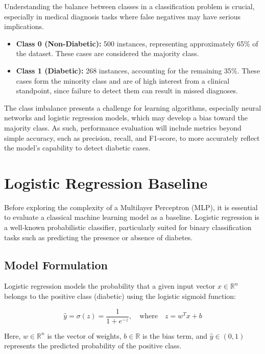 \documentclass[12pt]{article}
\begin{document}
Understanding the balance between classes in a classification problem is crucial, especially in medical diagnosis tasks where false negatives may have serious implications.

\begin{itemize}
    \item \textbf{Class 0 (Non-Diabetic):} 500 instances, representing approximately 65\% of the dataset. These cases are considered the majority class.
    
    \item \textbf{Class 1 (Diabetic):} 268 instances, accounting for the remaining 35\%. These cases form the minority class and are of high interest from a clinical standpoint, since failure to detect them can result in missed diagnoses.

\end{itemize}

The class imbalance presents a challenge for learning algorithms, especially neural networks and logistic regression models, which may develop a bias toward the majority class. As such, performance evaluation will include metrics beyond simple accuracy, such as precision, recall, and F1-score, to more accurately reflect the model’s capability to detect diabetic cases.

\section{Logistic Regression Baseline}

Before exploring the complexity of a Multilayer Perceptron (MLP), it is essential to evaluate a classical machine learning model as a baseline. Logistic regression is a well-known probabilistic classifier, particularly suited for binary classification tasks such as predicting the presence or absence of diabetes.

\subsection{Model Formulation}

Logistic regression models the probability that a given input vector \( x \in \mathbb{R}^n \) belongs to the positive class (diabetic) using the logistic sigmoid function:

\[
\hat{y} = \sigma(z) = \frac{1}{1 + e^{-z}}, \quad \text{where} \quad z = w^T x + b
\]

Here, \( w \in \mathbb{R}^n \) is the vector of weights, \( b \in \mathbb{R} \) is the bias term, and \( \hat{y} \in (0,1) \) represents the predicted probability of the positive class.
\end{document}
